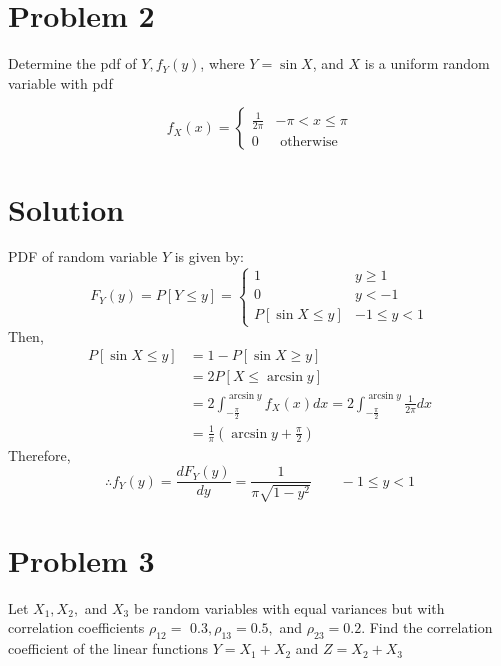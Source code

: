 \documentclass[10pt,a4paper,oneside]{article}
\begin{document}
 \section* {Problem 2} 
Determine the pdf of $Y, f_{Y}(y)$, where $Y=\sin X$, and $X$ is a uniform random variable with pdf

\[
f_{X}(x)=\left\{\begin{array}{cc}{\frac{1}{2 \pi}} & {-\pi<x \leq \pi} \\ {0} & {\text { otherwise }}\end{array}\right.
\]
\section* {Solution} 
PDF of random variable $Y$ is given by:
\[
F_{Y}(y)=P[Y \leq y]=\left\{\begin{array}{cl}{1} & {y \geq 1} \\ {0} & {y<-1} \\ {P[\sin X \leq y]} & {-1 \leq y<1}\end{array}\right.
\]
Then,
\[
\begin{aligned} P[\sin X \leq y] &=1-P[\sin X \geq y] \\ &=2 P[X \leq \arcsin y] \\ &=2 \int_{-\frac{\pi}{2}}^{\arcsin y} f_{X}(x) d x=2 \int_{-\frac{\pi}{2}}^{\arcsin y} \frac{1}{2 \pi} d x \\ &=\frac{1}{\pi}\left(\arcsin y+\frac{\pi}{2}\right) \end{aligned}
\]
Therefore,
\[
\therefore f_{Y}(y)=\frac{d F_{Y}(y)}{d y}=\frac{1}{\pi \sqrt{1-y^{2}}} \qquad-1 \leq y<1
\]
\section* {Problem 3} 
Let $X_{1}, X_{2},$ and $X_{3}$ be random variables with equal variances but with correlation coefficients $\rho_{12}=$
$0.3, \rho_{13}=0.5,$ and $\rho_{23}=0.2 .$ Find the correlation coefficient of the linear functions $Y=X_{1}+X_{2}$
and $Z=X_{2}+X_{3}$
\end{document}
